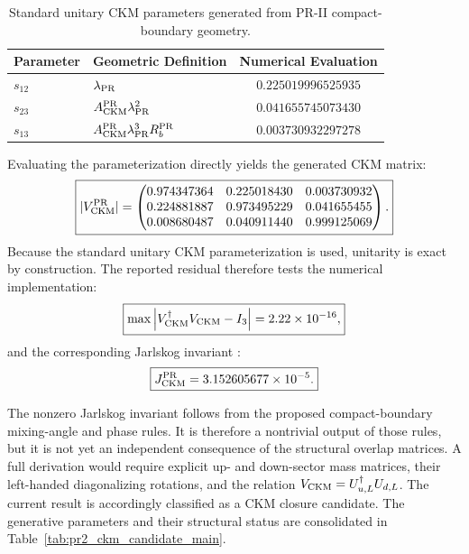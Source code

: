 \documentclass[11pt]{article}
\renewcommand{\arraystretch}{1.22}
\renewcommand{\arraystretch}{1.4}
\begin{document}
\begin{table}[ht!]
\centering
\caption{Standard unitary CKM parameters generated from PR-II compact-boundary geometry.}
\label{tab:pr2_ckm_standard_parameters}
\small
\renewcommand{\arraystretch}{1.25}
\begin{tabular}{llc}
\hline\hline
\textbf{Parameter} & \textbf{Geometric Definition} & \textbf{Numerical Evaluation} \\ \hline
\(s_{12}\) & \(\lambda_{\rm PR}\) & \(0.225019996525935\) \\
\(s_{23}\) & \(A_{\rm CKM}^{\rm PR}\lambda_{\rm PR}^2\) & \(0.041655745073430\) \\
\(s_{13}\) & \(A_{\rm CKM}^{\rm PR}\lambda_{\rm PR}^3 R_b^{\rm PR}\) & \(0.003730932297278\) \\ \hline\hline
\end{tabular}
\end{table}

Evaluating the parameterization directly yields the generated CKM matrix:
\begin{equation}
\boxed{
|V_{\rm CKM}^{\rm PR}|
=
\begin{pmatrix}
0.974347364 & 0.225018430 & 0.003730932 \\
0.224881887 & 0.973495229 & 0.041655455 \\
0.008680487 & 0.040911440 & 0.999125069
\end{pmatrix}.
}
\end{equation}
Because the standard unitary CKM parameterization is used, unitarity is exact by construction. The reported residual therefore tests the numerical implementation:
\begin{equation}
\boxed{
\max
\left|
V_{\rm CKM}^{\dagger}V_{\rm CKM}-I_3
\right|
=
2.22\times10^{-16},
}
\end{equation}
and the corresponding Jarlskog invariant \cite{Jarlskog1985}:
\begin{equation}
\boxed{
J_{\rm CKM}^{\rm PR}
=
3.152605677\times10^{-5}.
}
\end{equation}

The nonzero Jarlskog invariant follows from the proposed compact-boundary mixing-angle and phase rules. It is therefore a nontrivial output of those rules, but it is not yet an independent consequence of the structural overlap matrices. A full derivation would require explicit up- and down-sector mass matrices, their left-handed diagonalizing rotations, and the relation $V_{\rm CKM}=U_{u,L}^{\dagger}U_{d,L}$. The current result is accordingly classified as a CKM closure candidate. The generative parameters and their structural status are consolidated in Table~\ref{tab:pr2_ckm_candidate_main}.
\end{document}
